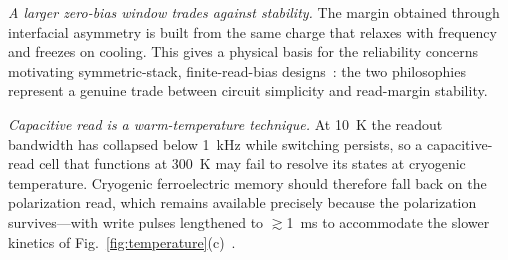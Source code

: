 \textit{A larger zero-bias window trades against stability.} The margin
obtained through interfacial asymmetry is built from the same charge that
relaxes with frequency and freezes on cooling. This gives a physical basis
for the reliability concerns motivating symmetric-stack, finite-read-bias
designs~\cite{lee2025aem,rana2025cp,fehlings2025}: the two philosophies
represent a genuine trade between circuit simplicity and read-margin
stability.

\textit{Capacitive read is a warm-temperature technique.} At 10~K the readout
bandwidth has collapsed below 1~kHz while switching persists, so a
capacitive-read cell that functions at 300~K may fail to resolve its states
at cryogenic temperature. Cryogenic ferroelectric memory should therefore
fall back on the polarization read, which remains available precisely because
the polarization survives---with write pulses lengthened to $\gtrsim$1~ms to
accommodate the slower kinetics of
Fig.~\ref{fig:temperature}(c)~\cite{das2026cryo}.